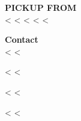 \parbox[t]{.50\textwidth}{
\textbf{PICKUP FROM} \\
<%
<%
<%
<%
<%
}
\parbox[t]{.38\textwidth}{
\textbf{Contact} \\
<%
<%

<%
<%

<%
<%

<%
<%
}